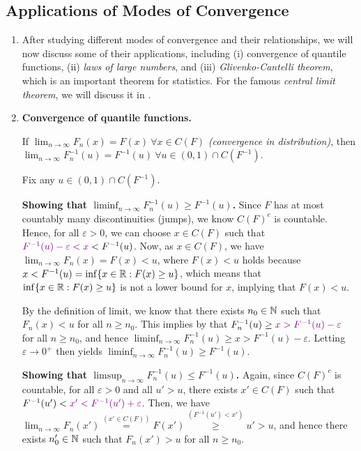 \subsection{Applications of Modes of Convergence}
\begin{enumerate}
\item After studying different modes of convergence and their relationships, we
will now discuss some of their applications, including (i) convergence of
quantile functions, (ii) \emph{laws of large numbers}, and (iii)
\emph{Glivenko-Cantelli theorem}, which is an important theorem for statistics.
For the famous \emph{central limit theorem}, we will discuss it in
.
\item \textbf{Convergence of quantile functions.}
\begin{proposition}
\label{prp:conv-quant-fun}
If \(\lim_{n\to\infty}F_n(x)=F(x)~\forall x\in C(F)\) \emph{(convergence in
distribution)}, then \(\lim_{n\to\infty}F_n^{-1}(u)=F^{-1}(u)~\forall u\in
(0,1)\cap C(F^{-1})\).
\end{proposition}
\begin{pf}
Fix any \(u\in (0,1)\cap C(F^{-1})\).

\textbf{Showing that \(\liminf_{n\to \infty}F_n^{-1}(u)\ge F^{-1}(u)\).} Since
\(F\) has at most countably many discontinuities (jumps), we know \(C(F)^{c}\)
is countable. Hence, for all \(\varepsilon>0\), we can choose \(x\in C(F)\)
such that \(\vc{F^{-1}(u)-\varepsilon<x}<F^{-1}(u)\). Now, as \(x\in C(F)\), we have
\(\lim_{n\to\infty}F_n(x)=F(x)<u\), where \(F(x)<u\) holds because \(x<F^{-1}(u)=
\inf\{x\in\mathbb{R}:F(x)\ge u\}\), which means that \(\inf\{x\in\mathbb{R}:F(x)\ge u\}\) is
not a lower bound for \(x\), implying that \(F(x)<u\).

By the definition of limit, we know that there exists \(n_0\in\mathbb{N}\) such that
\(F_n(x)<u\) for all \(n\ge n_0\). This implies by 
that \(F_{n}^{-1}(u)\ge \vc{x>F^{-1}(u)-\varepsilon}\) for all \(n\ge n_0\), and
hence \(\liminf_{n\to \infty}F_n^{-1}(u)\ge x>F^{-1}(u)-\varepsilon\). Letting
\(\varepsilon\to 0^{+}\) then yields \(\liminf_{n\to \infty}F_{n}^{-1}(u)\ge
F^{-1}(u)\).

\textbf{Showing that \(\limsup_{n\to \infty}F_n^{-1}(u)\le F^{-1}(u)\).}
Again, since \(C(F)^{c}\) is countable, for all \(\varepsilon>0\) and all
\(u'>u\), there exists \(x'\in C(F)\) such that \(F^{-1}(u')<\vc{x'<F^{-1}(u')+\varepsilon}\).
Then, we have \(\lim_{n\to\infty}F_n(x')\overset{(x'\in C(F))}{=}F(x')
\overset{(F^{-1}(u')<x')}{\ge}u'>u\), and hence there exists \(n_0'\in\mathbb{N}\) such
that \(F_n(x')>u\) for all \(n\ge n_0\). 


\end{pf}
\end{enumerate}
